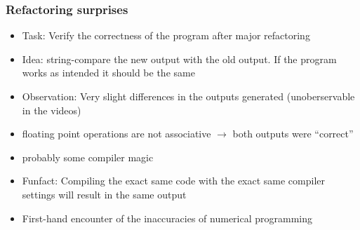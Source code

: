 \begin{frame}
    \frametitle{Refactoring surprises}
		\large
		\begin{itemize}
			\item<1-> Task: Verify the correctness of the program after major refactoring
			\item<2-> Idea: string-compare the new output with the old output. If the program works as intended it should be the same
			\item<3-> Observation: Very slight differences in the outputs generated (unoberservable in the videos)
		\end{itemize}
		\begin{itemize}
			\item<5-> floating point operations are not associative $\rightarrow$ both outputs were "`correct"'
			\item<6-> probably some compiler magic
			\item<7-> Funfact: Compiling the exact same code with the exact same compiler settings will result in the same output
			\item<8-> First-hand encounter of the inaccuracies of numerical programming
		\end{itemize}

\end{frame}
\clearpage